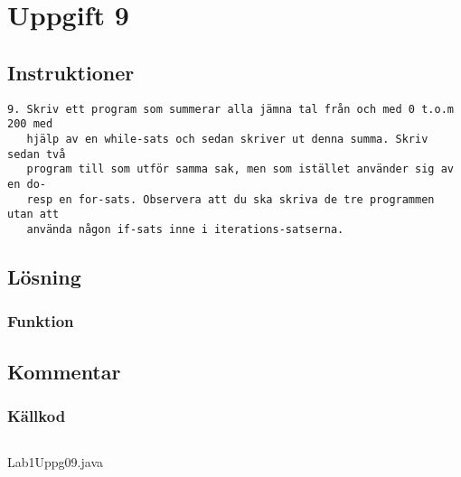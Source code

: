 \section{Uppgift 9}\label{uppgift-9}

\subsection{Instruktioner}
\begin{verbatim}
9. Skriv ett program som summerar alla jämna tal från och med 0 t.o.m 200 med
   hjälp av en while-sats och sedan skriver ut denna summa. Skriv sedan två
   program till som utför samma sak, men som istället använder sig av en do-
   resp en for-sats. Observera att du ska skriva de tre programmen utan att
   använda någon if-sats inne i iterations-satserna.
\end{verbatim}

\subsection{Lösning}
\subsubsection{Funktion}
\subsection{Kommentar}

\subsubsection{Källkod}\label{uppgift-9_src}
    \inputminted[linenos]{java}{src/Lab1Uppg09.java}
    \caption{Lab1Uppg09.java}
    \label{Uppg9src}
